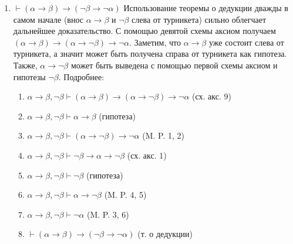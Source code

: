 \documentclass[10pt,a4paper,oneside]{article}
\begin{document}
\begin{enumerate}[label=(\alph*)]
\newpage
\item $\vdash(\alpha\rightarrow\beta)\rightarrow(\neg\beta\rightarrow\neg\alpha)$
\newline
Использование теоремы о дедукции дважды в самом начале (внос $\alpha \to \beta$ и $\neg\beta$ слева от турникета) сильно облегчает дальнейшее доказательство. С помощью девятой схемы аксиом получаем $(\alpha \to \beta) \to (\alpha \to \neg\beta) \to \neg\alpha$. Заметим, что $\alpha \to \beta$ уже состоит слева от турникета, а значит может быть получена справа от турникета как гипотеза. Также, $\alpha \to \neg\beta$ может быть выведена с помощью первой схемы аксиом и гипотезы $\neg\beta$. Подробнее:
\begin{enumerate}[label=(\arabic*)]
\item $\alpha \to \beta, \neg\beta \vdash (\alpha \to \beta) \to (\alpha \to \neg\beta) \to \neg\alpha$ (сх. акс. 9)
\item $\alpha \to \beta, \neg\beta \vdash \alpha \to \beta$ (гипотеза)
\item $\alpha \to \beta, \neg\beta \vdash (\alpha \to \neg\beta) \to \neg\alpha$ (M. P. 1, 2)
\item $\alpha \to \beta, \neg\beta \vdash \neg\beta \to \alpha \to \neg\beta$ (сх. акс. 1)
\item $\alpha \to \beta, \neg\beta \vdash \neg\beta$ (гипотеза)
\item $\alpha \to \beta, \neg\beta \vdash \alpha \to \neg\beta$ (M. P. 4, 5)
\item $\alpha \to \beta, \neg\beta \vdash \neg\alpha$ (M. P. 3, 6)
\item $\vdash (\alpha \to \beta) \to (\neg\beta \to \neg\alpha)$ (т. о дедукции)
\end{enumerate}
\end{enumerate}
\end{document}
